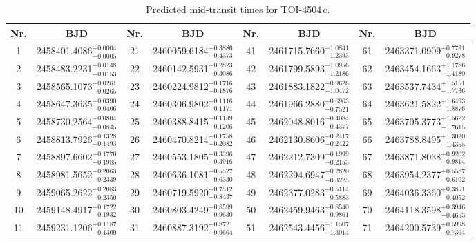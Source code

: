 \documentclass[twocolumn,twocolappendix]{aastex631}
\begin{document}
\begin{table}
\centering
\caption{Predicted mid-transit times for TOI-4504\,c.}
\label{Tab:TransitsPrediction}
\begin{tabular}{cc | cc | cc | cc}
\hline \hline
Nr. & BJD & Nr. & BJD & Nr. & BJD & Nr. & BJD \\ \hline
1  & 2458401.4086$_{-0.0005}^{+0.0004}$ & 21 & 2460059.6184$_{-0.4373}^{+0.3886}$ & 41 & 2461715.7660$_{-1.2393}^{+1.0841}$ & 61 & 2463371.0909$_{-0.9278}^{+0.7731}$ \\
2  & 2458483.2231$_{-0.0153}^{+0.0148}$ & 22 & 2460142.5931$_{-0.3086}^{+0.2823}$ & 42 & 2461799.5893$_{-1.2186}^{+1.0956}$ & 62 & 2463454.1663$_{-1.4180}^{+1.1786}$ \\
3  & 2458565.1073$_{-0.0265}^{+0.0261}$ & 23 & 2460224.9812$_{-0.1876}^{+0.1716}$ & 43 & 2461883.1822$_{-1.0472}^{+0.9626}$ & 63 & 2463537.7434$_{-1.7736}^{+1.5151}$ \\
4  & 2458647.3635$_{-0.0406}^{+0.0390}$ & 24 & 2460306.9802$_{-0.1171}^{+0.1116}$ & 44 & 2461966.2880$_{-0.7521}^{+0.6963}$ & 64 & 2463621.5822$_{-1.8876}^{+1.6493}$ \\
5  & 2458730.2564$_{-0.0845}^{+0.0804}$ & 25 & 2460388.8415$_{-0.1206}^{+0.1139}$ & 45 & 2462048.8016$_{-0.4377}^{+0.4084}$ & 65 & 2463705.3773$_{-1.7615}^{+1.5622}$ \\
6  & 2458813.7926$_{-0.1493}^{+0.1328}$ & 26 & 2460470.8214$_{-0.2082}^{+0.1758}$ & 46 & 2462130.8606$_{-0.2422}^{+0.2417}$ & 66 & 2463788.8495$_{-1.4355}^{+1.3020}$ \\
7  & 2458897.6602$_{-0.1985}^{+0.1770}$ & 27 & 2460553.1805$_{-0.3916}^{+0.3396}$ & 47 & 2462212.7309$_{-0.2153}^{+0.1999}$ & 67 & 2463871.8038$_{-0.9814}^{+0.9202}$ \\
8  & 2458981.5652$_{-0.2339}^{+0.2063}$ & 28 & 2460636.1081$_{-0.6330}^{+0.5527}$ & 48 & 2462294.6947$_{-0.3225}^{+0.2820}$ & 68 & 2463954.2377$_{-0.6102}^{+0.5587}$ \\
9  & 2459065.2622$_{-0.2350}^{+0.2083}$ & 29 & 2460719.5920$_{-0.8437}^{+0.7512}$ & 49 & 2462377.0283$_{-0.5883}^{+0.5114}$ & 69 & 2464036.3360$_{-0.4052}^{+0.3851}$ \\
10 & 2459148.4917$_{-0.1932}^{+0.1722}$ & 30 & 2460803.4249$_{-0.9630}^{+0.8599}$ & 50 & 2462459.9463$_{-0.9861}^{+0.8540}$ & 70 & 2464118.3598$_{-0.4653}^{+0.3946}$ \\
11 & 2459231.1206$_{-0.1300}^{+0.1187}$ & 31 & 2460887.3192$_{-0.9664}^{+0.8721}$ & 51 & 2462543.4456$_{-1.3014}^{+1.1507}$ & 71 & 2464200.5739$_{-0.7364}^{+0.5998}$ \\

\end{tabular}
\end{table}
\end{document}
